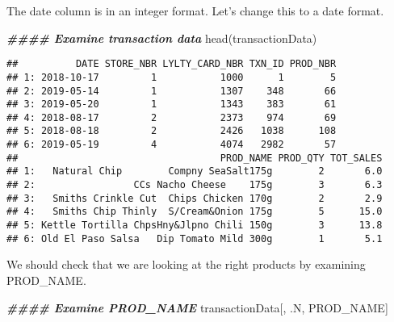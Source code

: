 \documentclass[
]{article}
\newenvironment{Shaded}{\begin{snugshade}}{\end{snugshade}}
\newcommand{\AttributeTok}[1]{\textcolor[rgb]{0.77,0.63,0.00}{#1}}
\newcommand{\DocumentationTok}[1]{\textcolor[rgb]{0.56,0.35,0.01}{\textbf{\textit{#1}}}}
\newcommand{\FunctionTok}[1]{\textcolor[rgb]{0.00,0.00,0.00}{#1}}
\newcommand{\NormalTok}[1]{#1}
\newcommand{\OtherTok}[1]{\textcolor[rgb]{0.56,0.35,0.01}{#1}}
\newcommand{\SpecialCharTok}[1]{\textcolor[rgb]{0.00,0.00,0.00}{#1}}
\newcommand{\StringTok}[1]{\textcolor[rgb]{0.31,0.60,0.02}{#1}}
\begin{document}
The date column is in an integer format. Let's change this to a date
format.

\begin{Shaded}
\end{Shaded}

\begin{Shaded}
\begin{Highlighting}[]
\DocumentationTok{\#\#\#\# Examine transaction data}
\FunctionTok{head}\NormalTok{(transactionData)}
\end{Highlighting}
\end{Shaded}

\begin{verbatim}
##          DATE STORE_NBR LYLTY_CARD_NBR TXN_ID PROD_NBR
## 1: 2018-10-17         1           1000      1        5
## 2: 2019-05-14         1           1307    348       66
## 3: 2019-05-20         1           1343    383       61
## 4: 2018-08-17         2           2373    974       69
## 5: 2018-08-18         2           2426   1038      108
## 6: 2019-05-19         4           4074   2982       57
##                                   PROD_NAME PROD_QTY TOT_SALES
## 1:   Natural Chip        Compny SeaSalt175g        2       6.0
## 2:                 CCs Nacho Cheese    175g        3       6.3
## 3:   Smiths Crinkle Cut  Chips Chicken 170g        2       2.9
## 4:   Smiths Chip Thinly  S/Cream&Onion 175g        5      15.0
## 5: Kettle Tortilla ChpsHny&Jlpno Chili 150g        3      13.8
## 6: Old El Paso Salsa   Dip Tomato Mild 300g        1       5.1
\end{verbatim}

We should check that we are looking at the right products by examining
PROD\_NAME.

\begin{Shaded}
\begin{Highlighting}[]
\DocumentationTok{\#\#\#\# Examine PROD\_NAME}
\NormalTok{transactionData[, .N, PROD\_NAME]}
\end{Highlighting}
\end{Shaded}
\end{document}
